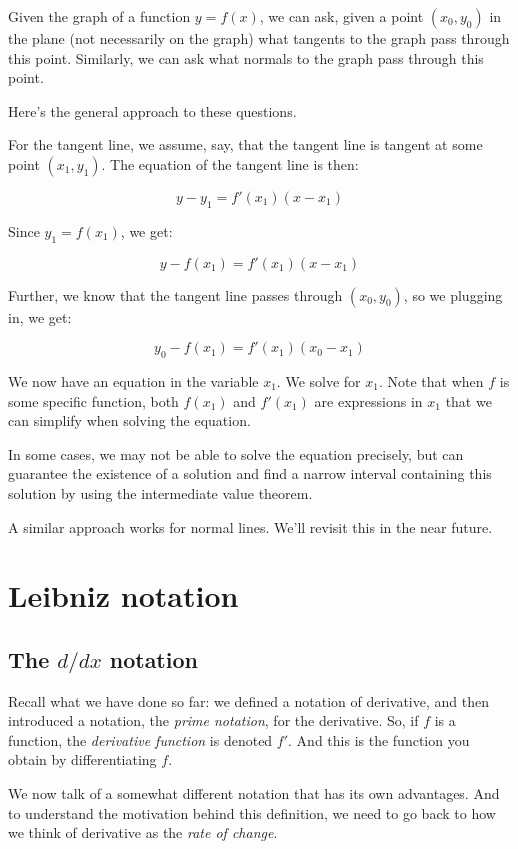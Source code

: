 \documentclass[10pt]{amsart}
\begin{document}
Given the graph of a function $y = f(x)$, we can ask, given a point
$(x_0,y_0)$ in the plane (not necessarily on the graph) what tangents
to the graph pass through this point. Similarly, we can ask what
normals to the graph pass through this point.

Here's the general approach to these questions.

For the tangent line, we assume, say, that the tangent line is tangent
at some point $(x_1,y_1)$. The equation of the tangent line is then:

$$y - y_1 = f'(x_1)(x - x_1)$$

Since $y_1 = f(x_1)$, we get:

$$y - f(x_1) = f'(x_1)(x - x_1)$$

Further, we know that the tangent line passes through $(x_0,y_0)$, so
we plugging in, we get:

$$y_0 - f(x_1) = f'(x_1)(x_0 - x_1)$$

We now have an equation in the variable $x_1$. We solve for
$x_1$. Note that when $f$ is some specific function, both $f(x_1)$ and
$f'(x_1)$ are expressions in $x_1$ that we can simplify when solving
the equation.

In some cases, we may not be able to solve the equation precisely, but
can guarantee the existence of a solution and find a narrow interval
containing this solution by using the intermediate value theorem.

A similar approach works for normal lines. We'll revisit this in the
near future.
\section{Leibniz notation}

\subsection{The $d/dx$ notation}

Recall what we have done so far: we defined a notation of derivative,
and then introduced a notation, the {\em prime notation}, for the
derivative. So, if $f$ is a function, the {\em derivative function} is
denoted $f'$. And this is the function you obtain by differentiating
$f$.

We now talk of a somewhat different notation that has its own
advantages. And to understand the motivation behind this definition,
we need to go back to how we think of derivative as the {\em rate of
change}.
\end{document}
